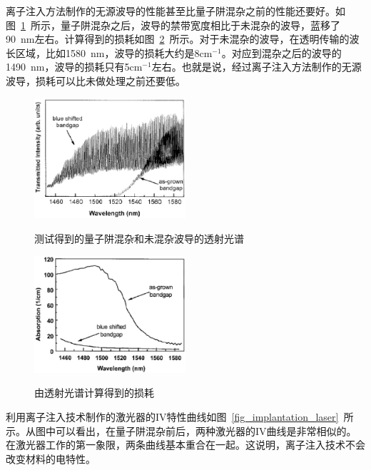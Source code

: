 \documentclass{ZJUthesis}
\begin{document}
离子注入方法制作的无源波导的性能甚至比量子阱混杂之前的性能还要好\cite{He1995Bandgap}。如图~\ref{fig_implantation_wg_test}~所示，量子阱混杂之后，波导的禁带宽度相比于未混杂的波导，蓝移了90~nm左右。计算得到的损耗如图~\ref{fig_implantation_wg_loss}~所示。对于未混杂的波导，在透明传输的波长区域，比如1580~nm，波导的损耗大约是8cm$^{-1}$。对应到混杂之后的波导的1490~nm，波导的损耗只有5cm$^{-1}$左右。也就是说，经过离子注入方法制作的无源波导，损耗可以比未做处理之前还要低。

\begin{figure}[htbp]
  \centering
  \includegraphics[width=0.5\textwidth]{./Pictures/implantation_wg_test.eps}\\
  \caption{测试得到的量子阱混杂和未混杂波导的透射光谱}
  \label{fig_implantation_wg_test}
\end{figure}

\begin{figure}[htbp]
  \centering
  \includegraphics[width=0.5\textwidth]{./Pictures/implantation_wg_loss.eps}\\
  \caption{由透射光谱计算得到的损耗}
  \label{fig_implantation_wg_loss}
\end{figure}

利用离子注入技术制作的激光器的IV特性曲线如图~\ref{fig_implantation_laser}~所示。从图中可以看出，在量子阱混杂前后，两种激光器的IV曲线是非常相似的。在激光器工作的第一象限，两条曲线基本重合在一起。这说明，离子注入技术不会改变材料的电特性。
\end{document}
